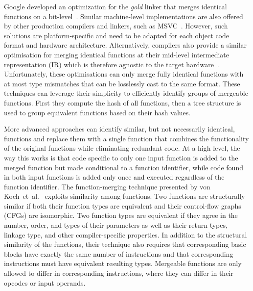 Google developed an optimization for the \textit{gold} linker that merges
identical functions on a bit-level~\cite{tallam10,kwan12}. 
Similar machine-level implementations are also offered by other production compilers
and linkers, such as MSVC~\cite{msvc-icf}.
However, such solutions are platform-specific and need to be adapted for each object code format and hardware architecture.
Alternatively, compilers also provide a similar optimisation for merging identical functions at their mid-level intermediate representation (IR) which is therefore agnostic to the target hardware~\cite{llvm-fm,livska14}.
Unfortunately, these optimisations can only merge fully identical functions with at most type mismatches that can be losslessly cast to the same format.
These techniques can leverage their simplicity to efficiently identify groups of mergeable functions.
First they compute the hash of all functions, then a tree structure is used to group equivalent functions based on their hash values.

More advanced approaches can identify similar, but not necessarily identical, functions and replace them with a single function that combines the functionality of the original functions while eliminating redundant code.
At a high level, the way this works is that code specific to only one input function is added to the merged function but made conditional to a function identifier, while code found in both input functions is added only once and executed regardless of the function identifier.
The function-merging technique presented by von Koch~et~al.~\cite{edler14} exploits similarity among functions.
Two functions are structurally similar if both their function types are equivalent
and their control-flow graphs (CFGs) are isomorphic.
Two function types are equivalent if they agree in the number, order, and types
of their parameters as well as
their return types, linkage type, and other compiler-specific properties.
In addition to the structural similarity of the functions, their technique also
requires that corresponding basic blocks have exactly the same number of instructions
and that corresponding instructions must have equivalent resulting types.
Mergeable functions are only allowed to differ in corresponding instructions,
where they can differ in their opcodes or input operands.

